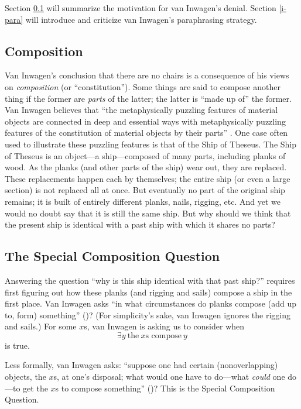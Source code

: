 \documentclass[12pt,twoside]{reedfancy}
\begin{document}
\begin{spacing}{1.25}
Section \ref{comp} will summarize the motivation for van Inwagen's
denial.  Section \ref{i-para} will introduce and criticize van
Inwagen's paraphrasing strategy.

\subsection{Composition}
\label{comp}
Van Inwagen's conclusion that there are no chairs is a consequence of
his views on {\em composition} (or ``constitution'').  Some things are
said to compose another thing if the former are {\em parts} of the
latter; the latter is ``made up of'' the former.  Van Inwagen believes
that ``the metaphysically puzzling features of material objects are
connected in deep and essential ways with metaphysically puzzling
features of the constitution of material objects by their parts''
\citep[18]{inwagen1995}.  One case often used to illustrate these
puzzling features is that of the Ship of Theseus.  The Ship of Theseus
is an object---a ship---composed of many parts, including planks of
wood.  As the planks (and other parts of the ship) wear out, they are
replaced.  These replacements happen each by themselves; the entire
ship (or even a large section) is not replaced all at once.  But
eventually no part of the original ship remains; it is built of
entirely different planks, nails, rigging, etc.  And yet we would no
doubt say that it is still the same ship.  But why should we think
that the present ship is identical with a past ship with which it
shares no parts?

\subsection{The Special Composition Question}
\label{scq}
Answering the question ``why is this ship identical with that past
ship?'' requires first figuring out how these planks (and rigging and
sails) compose a ship in the first place.  Van Inwagen asks ``in what
circumstances do planks compose (add up to, form) something''
(\citeyear[21]{inwagen1995})?  (For simplicity's sake, van Inwagen
ignores the rigging and sails.)  For some $x$s, van Inwagen is asking
us to consider when
\begin{displaymath}
\exists y\ \text{the}\ x\text{s compose}\ y
\end{displaymath}
is true.

Less formally, van Inwagen asks: ``suppose one had certain
(nonoverlapping) objects, the $x$s, at one's disposal; what would one
have to do---what {\em could} one do---to get the $x$s to compose
something'' (\citeyear[31]{inwagen1995})?  This is the Special
Composition Question.


\end{spacing}
\end{document}
